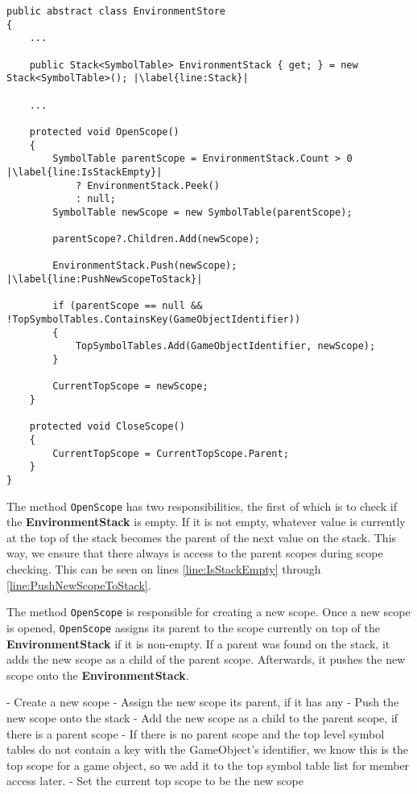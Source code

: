 \begin{lstlisting}[language=CSharp, caption={Abstract class SemanticAnalysis}, label={lst:ACSemanticAnalysis},escapechar=|]
public abstract class EnvironmentStore
{
    ...

    public Stack<SymbolTable> EnvironmentStack { get; } = new Stack<SymbolTable>(); |\label{line:Stack}|

    ...

    protected void OpenScope()
    {
        SymbolTable parentScope = EnvironmentStack.Count > 0 |\label{line:IsStackEmpty}|
            ? EnvironmentStack.Peek() 
            : null;
        SymbolTable newScope = new SymbolTable(parentScope);
        
        parentScope?.Children.Add(newScope);
        
        EnvironmentStack.Push(newScope); |\label{line:PushNewScopeToStack}|

        if (parentScope == null && !TopSymbolTables.ContainsKey(GameObjectIdentifier))
        {
            TopSymbolTables.Add(GameObjectIdentifier, newScope);
        }
        
        CurrentTopScope = newScope;
    }

    protected void CloseScope()
    {
        CurrentTopScope = CurrentTopScope.Parent;
    }
}
\end{lstlisting}

The method \texttt{OpenScope} has two responsibilities, the first of which is to check if the \textbf{EnvironmentStack} is empty. If it is not empty, whatever value is currently at the top of the stack becomes the parent of the next value on the stack. This way, we ensure that there always is access to the parent scopes during scope checking. This can be seen on lines \ref{line:IsStackEmpty} through \ref{line:PushNewScopeToStack}.


The method \texttt{OpenScope} is responsible for creating a new scope. Once a new scope is opened, \texttt{OpenScope} assigns its parent to the scope currently on top of the \textbf{EnvironmentStack} if it is non-empty.
If a parent was found on the stack, it adds the new scope as a child of the parent scope.
Afterwards, it pushes the new scope onto the \textbf{EnvironmentStack}. 

- Create a new scope
- Assign the new scope its parent, if it has any 
- Push the new scope onto the stack
- Add the new scope as a child to the parent scope, if there is a parent scope 
- If there is no parent scope and the top level symbol tables do not contain a key with the GameObject's identifier, we know this is the top scope for a game object, so we add it to the top symbol table list for member access later.
- Set the current top scope to be the new scope


